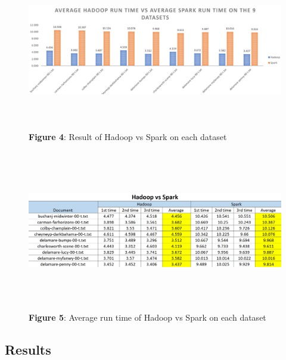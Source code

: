 \documentclass[12pt]{article}
\begin{document}
	\begin{figure}[H]
	\centering
	\includegraphics[width=160mm, height=70mm, scale=1.0]{images/Hadoop_vs_Spark_graph.PNG}
	\caption*{\textbf{Figure 4}: Result of Hadoop vs Spark on each dataset}
	\end{figure}
	
	\begin{figure}[H]
	\centering
	\includegraphics[width=160mm, height=70mm, scale=1.0]{images/Hadoop_vs_Spark_table.PNG}
	\caption*{\textbf{Figure 5}: Average run time of Hadoop vs Spark on each dataset}
	\end{figure}
	
	\subsection{Results}
		\paragraph{} 
		\bigskip
		
\end{document}
